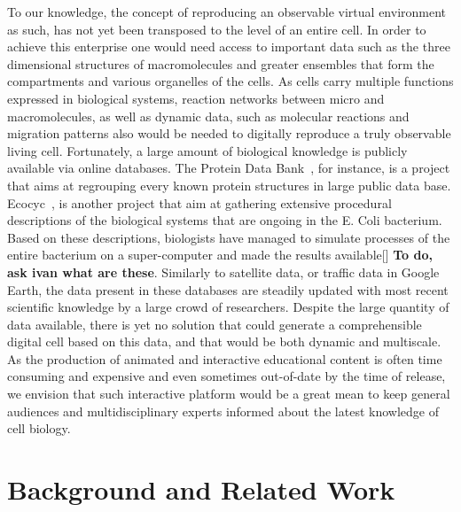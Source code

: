 To our knowledge, the concept of reproducing an observable virtual environment as such, has not yet been transposed to the level of an entire cell.
In order to achieve this enterprise one would need access to important data such as the three dimensional structures of macromolecules and greater ensembles that form the compartments and various organelles of the cells.
As cells carry multiple functions expressed in biological systems, reaction networks between micro and macromolecules, as well as dynamic data, such as molecular reactions and migration patterns also would be needed to digitally reproduce a truly observable living cell.
Fortunately, a large amount of biological knowledge is publicly available via online databases.
The Protein Data Bank~\cite{bernstein1977protein}, for instance, is a project that aims at regrouping every known protein structures in large public data base.
Ecocyc~\cite{keseler2005ecocyc}, is another project that aim at gathering extensive procedural descriptions of the biological systems that are ongoing in the E. Coli bacterium.
Based on these descriptions, biologists have managed to simulate processes of the entire bacterium on a super-computer and made the results available[] \textbf{To do, ask ivan what are these}.
Similarly to satellite data, or traffic data in Google Earth, the data present in these databases are steadily updated with most recent scientific knowledge by a large crowd of researchers.
Despite the large quantity of data available, there is yet no solution that could generate a comprehensible digital cell based on this data, and that would be both dynamic and multiscale.
As the production of animated and interactive educational content is often time consuming and expensive and even sometimes out-of-date by the time of release, we envision that such interactive platform would be a great mean to keep general audiences and multidisciplinary experts informed about the latest knowledge of cell biology.

\section{Background and Related Work}

